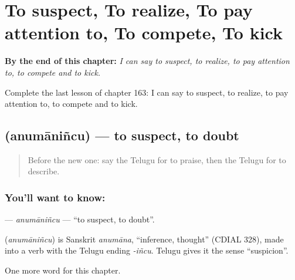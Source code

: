 
\chapter{To suspect, To realize, To pay attention to, To compete, To kick}
\label{ch:te-to-suspect-to-realize-to-pay-attention-to-to-compete-to-kick}

\begin{chapteropening}
\textbf{By the end of this chapter:} \emph{I can say to suspect, to realize, to pay attention to, to compete and to kick.}

Complete the last lesson of chapter 163: I can say to suspect, to realize, to pay attention to, to compete and to kick.
\end{chapteropening}

\section[\texorpdfstring{\te{అనుమానించు} (anumāniñcu)}{అనుమానించు (anumāniñcu)}]{ (anumāniñcu) — to suspect, to doubt}

\label{lesson:TE-C163-anumanincu}



\begin{quote}
Before the new one: say the Telugu for to praise, then the Telugu for to describe.
\end{quote}

\subsection*{You'll want to know: }
\textbf{} — \emph{anumāniñcu} — \textquotedblleft{}to suspect, to doubt\textquotedblright{}.

\begin{cousinweb}
\textbf{} (\emph{anumāniñcu}) is Sanskrit \emph{anumāna}, \textquotedblleft{}inference, thought\textquotedblright{} (CDIAL 328), made into a verb with the Telugu ending \emph{-iñcu}. Telugu gives it the sense \textquotedblleft{}suspicion\textquotedblright{}.
\end{cousinweb}

\begin{grammarlens}[title={What you've built}]
One more word for this chapter.
\end{grammarlens}

